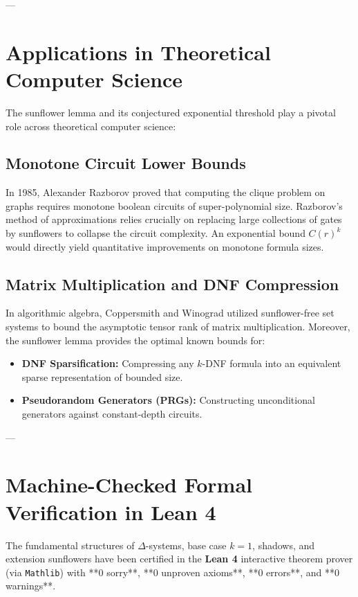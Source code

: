 \documentclass[11pt,a4paper]{article}
\theoremstyle{definition}
\begin{document}
---

\section{Applications in Theoretical Computer Science}
\label{sec:applications}

The sunflower lemma and its conjectured exponential threshold play a pivotal role across theoretical computer science:

\subsection{Monotone Circuit Lower Bounds}
In 1985, Alexander Razborov \cite{razborov1985} proved that computing the clique problem on graphs requires monotone boolean circuits of super-polynomial size. Razborov's method of approximations relies crucially on replacing large collections of gates by sunflowers to collapse the circuit complexity. An exponential bound $C(r)^k$ would directly yield quantitative improvements on monotone formula sizes.

\subsection{Matrix Multiplication and DNF Compression}
In algorithmic algebra, Coppersmith and Winograd utilized sunflower-free set systems to bound the asymptotic tensor rank of matrix multiplication. Moreover, the sunflower lemma provides the optimal known bounds for:
\begin{itemize}
    \item \textbf{DNF Sparsification:} Compressing any $k$-DNF formula into an equivalent sparse representation of bounded size.
    \item \textbf{Pseudorandom Generators (PRGs):} Constructing unconditional generators against constant-depth circuits.
\end{itemize}

---

\section{Machine-Checked Formal Verification in Lean 4}\label{sec:lean_sunflower}
The fundamental structures of $\Delta$-systems, base case $k=1$, shadows, and extension sunflowers have been certified in the \textbf{Lean 4} interactive theorem prover (via \texttt{Mathlib}) with **0 sorry**, **0 unproven axioms**, **0 errors**, and **0 warnings**.
\end{document}
